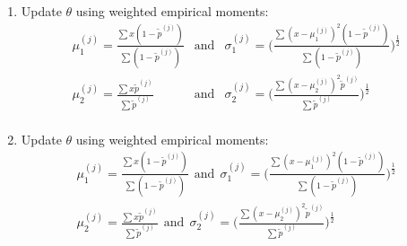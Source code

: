 \documentclass[article,nojss,shortnames]{jss}
\begin{document}
\begin{algorithm}
\begin{enumerate}
        \item Update $\mathit{\theta}$ using weighted empirical moments:
            \begin{eqnarray*}
                    \mu_1^{(j)} = \frac{\sum \mathit{x} (1 - \tilde{p}^{(j)})}{\sum (1 - \tilde{p}^{(j)})}
                    &\text{and}&
                    \sigma_1^{(j)} = \Big( \frac{\sum (x - \mu_1^{(j)})^2 (1 - \tilde{p}^{(j)})}{\sum(1 - \tilde{p}^{(j)})} \Big)^\frac{1}{2} \\
                    \mu_2^{(j)} = \frac{\sum \mathit{x} \tilde{p}^{(j)}}{\sum \tilde{p}^{(j)}}
                    &\text{and}&
                    \sigma_2^{(j)} = \Big( \frac{\sum (x - \mu_2^{(j)})^2 \tilde{p}^{(j)}}{\sum \tilde{p}^{(j)}} \Big)^\frac{1}{2} \\
            \end{eqnarray*}
            
        \item Update $\mathit{\theta}$ using weighted empirical moments:
            \begin{equation*}
                \begin{split}
                    \mu_1^{(j)} = \frac{\sum \mathit{x} (1 - \tilde{p}^{(j)})}{\sum (1 - \tilde{p}^{(j)})}
                    ~~\text{and}~~
                    \sigma_1^{(j)} = \Big( \frac{\sum (x - \mu_1^{(j)})^2 (1 - \tilde{p}^{(j)})}{\sum(1 - \tilde{p}^{(j)})} \Big)^\frac{1}{2} \\
                    \mu_2^{(j)} = \frac{\sum \mathit{x} \tilde{p}^{(j)}}{\sum \tilde{p}^{(j)}}
                    ~~\text{and}~~
                    \sigma_2^{(j)} = \Big( \frac{\sum (x - \mu_2^{(j)})^2 \tilde{p}^{(j)}}{\sum \tilde{p}^{(j)}} \Big)^\frac{1}{2} \\
                \end{split}
            \end{equation*}


\end{enumerate}
\end{algorithm}
\end{document}
